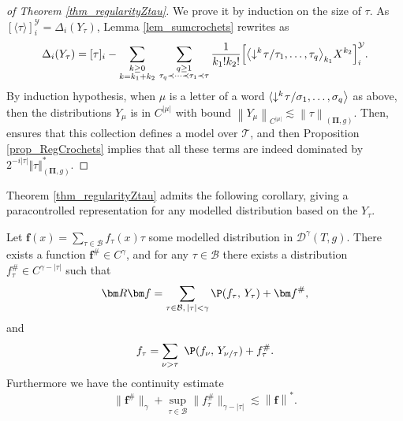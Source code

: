 \documentclass[11pt]{preprint}
\newcommand{\mcB}{\mathcal{B}}
\newcommand{\mcY}{\mathcal{Y}}
\newcommand{\mcD}{\mathcal{D}}
\def\PPi{\boldsymbol{\Pi}}
\renewcommand{\lg}{\langle}
\newcommand{\rg}{\rangle}
\newcommand{\scrT}{\mathscr{T}}
\newcommand{\norme}[1]{\left\lVert #1 \right\lVert}
\begin{document}
	\begin{proof}[of Theorem \ref{thm_regularityZtau}]
		We prove it by induction on the size of  $\tau$. As $[\lg\tau\rg]^\mcY_i = \Delta_i( Y_\tau)$, Lemma \ref{lem_sumcrochets} rewrites as 
		$$
		\Delta_i( Y_\tau) = [\tau]_i - \sum_{\substack{k\geq 0\\k=k_1+k_2}}\, \sum_{\substack{q\geq 1 \\ \tau_q\prec\dots\prec\tau_1\prec \tau}} \frac{1}{k_1!k_2!}\Big[ \big\lg {\downarrow^k\hspace{-2pt}\tau/\tau_1}, \dots , {\tau_q}   \big\rg_{k_1} X^{k_2} \Big]_i^\mcY.
		$$
		By induction hypothesis, when $\mu$ is a letter of a word $\lg {\downarrow^k\hspace{-2pt}\tau/\sigma_1}, \dots , {\sigma_q}   \big\rg$ as above, then the distributions $Y_\mu$ is in $C^{|\mu|}$ with bound $\norme{Y_\mu}_{C^{|\mu|}}\lesssim \norme{\tau}_{(\PPi,g)}$. 
		Then,  \cite[Theorem 1]{LocalExpansionsParacSystems} ensures that this collection defines a model over $\scrT$, and then Proposition \ref{prop_RegCrochets} implies that
		all these terms are indeed dominated by $2^{-i|\tau|} \Vert\tau\Vert_{ (\PPi,g)}^*$.
	\end{proof}
	
	
	
	Theorem \ref{thm_regularityZtau} admits the following corollary, giving a paracontrolled representation for any modelled distribution based on the $Y_\tau$.
	
	
	\begin{corollary}\label{cor_repmodelledditribParap}
		Let ${\bm f}(x) = \sum_{\tau\in \mcB} f_\tau(x) \tau$ some modelled distribution in $\mcD^\gamma(T,{ g})$. There exists a function ${\bm f}^\# \in C^\gamma$, and for any $\tau\in\mcB$ there exists a distribution $f_\tau^\# \in C^{\gamma-|\tau|}$ such that
		\begin{equation}\label{eq_repreconstructionfparap}
			{\bm R}{\bm f} = \sum_{\tau \in \mcB, \, |\tau|<\gamma} \P({f_\tau},\,  Y_{\tau})  + {\bm f}^\#,
		\end{equation}
		and
		\begin{equation}\label{eq_repftauparap}
			f_\tau = \sum_{\nu > \tau} \, \,  \P({f_\nu},\,  Y_{\nu /\tau})  + f_\tau^\#.
		\end{equation}
		Furthermore we have the continuity estimate
		\begin{equation}
			\lVert {{\bm f}^\#} \rVert_\gamma + \sup_{\tau\in\mcB }\lVert {f_\tau^\#}\lVert_{\gamma-|\tau|} \lesssim \norme{\bm f}^*.
		\end{equation}
	\end{corollary}
	
\end{document}
